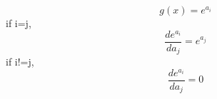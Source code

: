 \documentclass{article}
\begin{document}
\[g(x)=e^{a_{i}}\]
if i=j,
\[\frac{de^{a_{i}}}{da_{j}}=e^{a_{j}}\]
if i!=j,
\[\frac{de^{a_{i}}}{da_{j}}=0\]
\end{document}

